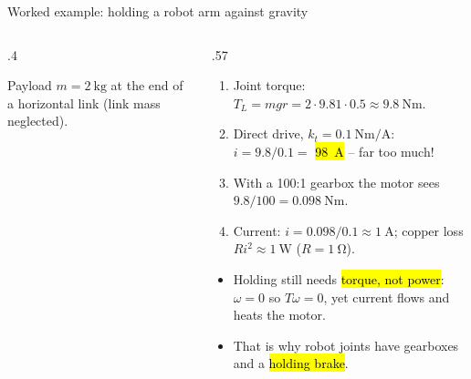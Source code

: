\documentclass[aspectratio=169,10pt]{beamer}
\begin{document}
\begin{frame}{Worked example: holding a robot arm against gravity}
\begin{columns}[T]
\begin{column}{.4\textwidth}
\centering
{}

\vspace{2mm}
\small
Payload $m=\SI{2}{\kilo\gram}$ at the end of a horizontal link (link mass neglected).
\end{column}
\begin{column}{.57\textwidth}
\begin{defbox}
\small
\begin{enumerate}\setlength\itemsep{2pt}
\item Joint torque: $T_L=m g r=2\cdot9.81\cdot0.5\approx\SI{9.8}{\newton\metre}$.
\item Direct drive, $k_t=\SI{0.1}{\newton\metre\per\ampere}$: $i=9.8/0.1=$ \hl{\SI{98}{\ampere}} -- far too much!
\item With a 100:1 gearbox the motor sees $9.8/100=\SI{0.098}{\newton\metre}$.
\item Current: $i=0.098/0.1\approx\SI{1}{\ampere}$; copper loss $Ri^2\approx\SI{1}{\watt}$ ($R=\SI{1}{\ohm}$).
\end{enumerate}
\end{defbox}
\small
\begin{itemize}\setlength\itemsep{1pt}
\item Holding still needs \hl{torque, not power}: $\omega=0$ so $T\omega=0$, yet current flows and heats the motor.
\item That is why robot joints have gearboxes and a \hl{holding brake}.
\end{itemize}
\end{column}
\end{columns}
\end{frame}
\end{document}
